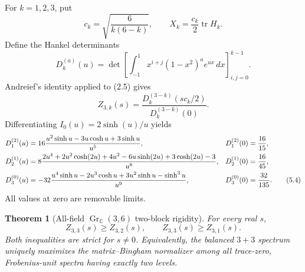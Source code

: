 \documentclass[11pt]{article}
\newtheorem{theorem}{Theorem}[section]
\newcommand{\C}{\mathbb C}
\newcommand{\tr}{\operatorname{tr}}
\newcommand{\Gr}{\operatorname{Gr}}
\begin{document}
For $k=1,2,3$, put
\begin{equation}
 c_k=\sqrt{\frac6{k(6-k)}},\qquad
 X_k=\frac{c_k}{2}\tr H_k.                                 \tag{5.1}
\end{equation}
Define the Hankel determinants
\begin{equation}
 D_k^{(a)}(u)=\det\left[
 \int_{-1}^{1}x^{i+j}(1-x^2)^a e^{ux}\,dx
 \right]_{i,j=0}^{k-1}.                                   \tag{5.2}
\end{equation}
Andreief's identity \cite{Andreief1883,Forrester2010} applied to (2.5)
gives
\begin{equation}
 Z_{3,k}(s)=\frac{D_k^{(3-k)}(sc_k/2)}{D_k^{(3-k)}(0)}.      \tag{5.3}
\end{equation}
Differentiating $I_0(u)=2\sinh(u)/u$ yields
\begin{align}
D_1^{(2)}(u)
 &=16\frac{u^2\sinh u-3u\cosh u+3\sinh u}{u^5},
&D_1^{(2)}(0)&=\frac{16}{15},\notag\\
D_2^{(1)}(u)
 &=8\frac{2u^4+2u^2\cosh(2u)+4u^2-6u\sinh(2u)
             +3\cosh(2u)-3}{u^8},
&D_2^{(1)}(0)&=\frac{16}{45},\notag\\
D_3^{(0)}(u)
 &=-32\frac{u^4\sinh u-2u^3\cosh u+3u^2\sinh u-\sinh^3u}{u^9},
&D_3^{(0)}(0)&=\frac{32}{135}.                              \tag{5.4}
\end{align}
All values at zero are removable limits.

\begin{theorem}[All-field $\Gr_{\C}(3,6)$ two-block rigidity]
\label{thm:gr36}
For every real $s$,
\begin{equation}
 Z_{3,3}(s)\ge Z_{3,2}(s),\qquad
 Z_{3,3}(s)\ge Z_{3,1}(s).                                 \tag{5.5}
\end{equation}
Both inequalities are strict for $s\ne0$.  Equivalently, the balanced
$3+3$ spectrum uniquely maximizes the matrix--Bingham normalizer among all
trace-zero, Frobenius-unit spectra having exactly two levels.
\end{theorem}
\end{document}

